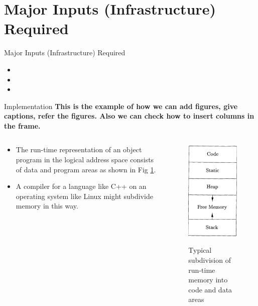 \documentclass{beamer}
\begin{document}
\section{Major Inputs (Infrastructure) Required}
\begin{frame}{Major Inputs (Infrastructure) Required}

	\begin{itemize}
		\item
		\item
		\item
	\end{itemize}

\end{frame}
\begin{frame}{Implementation}
	\color{red}\textbf{This is the example of how we can add figures, give captions, refer the figures. Also we can check how to insert columns in the frame.}
\begin{columns}
	\begin{column}{.6\linewidth}
		\begin{itemize}
			\item The run-time representation of an object program in the logical address space consists of data and program areas as shown in Fig \ref{wk51}. 
			\item A compiler for a language like C++ on an operating system like Linux might subdivide memory in this way.
		\end{itemize}
	\end{column}
	\begin{column}{.4\linewidth}
		\begin{center}
			\begin{figure}
				{\includegraphics[scale=.4]{wk51}}
				\caption{Typical subdivision of run-time memory into code and data areas}
				\label{wk51}
			\end{figure}
		\end{center}
	\end{column}
\end{columns}
	
\end{frame}
\end{document}

